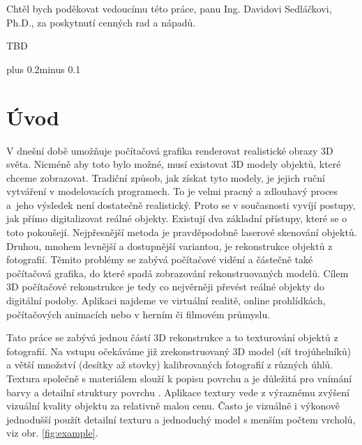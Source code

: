 \documentclass[11pt,twoside,a4paper]{book}
\begin{document}

\coverpagestarts

\acknowledgements \noindent \noindent Chtěl bych poděkovat vedoucímu této práce,
panu Ing. Davidovi Sedláčkovi, Ph.D., za poskytnutí cenných rad a nápadů.

 
\abstractpage
TBD


\tableofcontents

\listoffigures

\listoftables

\renewcommand*{\lstlistlistingname}{Seznam zdrojových kódů}
\lstlistoflistings

\mainbodystarts
\normalfont {}\baselineskip plus 0.2\baselineskip minus
0.1\baselineskip


\chapter{Úvod}
V dnešní době umožňuje počítačová grafika renderovat realistické obrazy 3D
světa. Nicméně aby toto bylo možné, musí existovat 3D modely objektů, které
chceme zobrazovat. Tradiční způsob, jak získat tyto modely, je jejich ruční
vytváření v modelovacích programech. To je velmi pracný a zdlouhavý proces
a~jeho výsledek není dostatečně realistický. Proto se v současnosti vyvíjí
postupy, jak přímo digitalizovat reálné objekty. Existují dva základní přístupy,
které se o toto pokoušejí. Nejpřesnější metoda je pravděpodobně laserové
skenování objektů. Druhou, mnohem levnější a dostupnější variantou, je rekonstrukce objektů z
fotografií. Těmito problémy se zabývá počítačové vidění a částečně také
počítačová grafika, do které spadá zobrazování rekonstruovaných modelů. Cílem 3D
počítačové rekonstrukce je tedy co nejvěrněji převést reálné objekty do
digitální podoby. Aplikaci najdeme ve virtuální realitě, online prohlídkách,
počítačových animacích nebo v herním či filmovém průmyslu.

Tato práce se zabývá jednou částí 3D rekonstrukce a to texturování objektů z
fotografií. Na vstupu očekáváme již zrekonstruovaný 3D model (síť trojúhelníků)
a větší množství (desítky až stovky) kalibrovaných fotografií z různých úhlů. Textura společně s materiálem slouží k popisu povrchu a je důležitá pro vnímání barvy a detailní struktury povrchu \cite{mpg}. Aplikace textury vede z výraznému zvýšení vizuální kvality objektu za relativně malou cenu.  Často je vizuálně i výkonově jednodušší použít detailní texturu a jednoduchý model s menším počtem vrcholů, viz obr. \ref{fig:example}.
\end{document}
